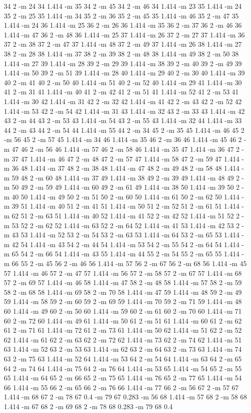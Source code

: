 \documentclass[12pt]{article}
\begin{document}
34 2 -m 24 34 1.414 -m 35 34 2 -m 45 34 2 -m 46 34 1.414 -m 23 35 1.414 -m 24 35 2 -m 25 35 1.414 -m 34 35 2 -m 36 35 2 -m 45 35 1.414 -m 46 35 2 -m 47 35 1.414 -m 24 36 1.414 -m 25 36 2 -m 26 36 1.414 -m 35 36 2 -m 37 36 2 -m 46 36 1.414 -m 47 36 2 -m 48 36 1.414 -m 25 37 1.414 -m 26 37 2 -m 27 37 1.414 -m 36 37 2 -m 38 37 2 -m 47 37 1.414 -m 48 37 2 -m 49 37 1.414 -m 26 38 1.414 -m 27 38 2 -m 28 38 1.414 -m 37 38 2 -m 39 38 2 -m 48 38 1.414 -m 49 38 2 -m 50 38 1.414 -m 27 39 1.414 -m 28 39 2 -m 29 39 1.414 -m 38 39 2 -m 40 39 2 -m 49 39 1.414 -m 50 39 2 -m 51 39 1.414 -m 28 40 1.414 -m 29 40 2 -m 30 40 1.414 -m 39 40 2 -m 41 40 2 -m 50 40 1.414 -m 51 40 2 -m 52 40 1.414 -m 29 41 1.414 -m 30 41 2 -m 31 41 1.414 -m 40 41 2 -m 42 41 2 -m 51 41 1.414 -m 52 41 2 -m 53 41 1.414 -m 30 42 1.414 -m 31 42 2 -m 32 42 1.414 -m 41 42 2 -m 43 42 2 -m 52 42 1.414 -m 53 42 2 -m 54 42 1.414 -m 31 43 1.414 -m 32 43 2 -m 33 43 1.414 -m 42 43 2 -m 44 43 2 -m 53 43 1.414 -m 54 43 2 -m 55 43 1.414 -m 32 44 1.414 -m 33 44 2 -m 43 44 2 -m 54 44 1.414 -m 55 44 2 -m 34 45 2 -m 35 45 1.414 -m 46 45 2 -m 56 45 2 -m 57 45 1.414 -m 34 46 1.414 -m 35 46 2 -m 36 46 1.414 -m 45 46 2 -m 47 46 2 -m 56 46 1.414 -m 57 46 2 -m 58 46 1.414 -m 35 47 1.414 -m 36 47 2 -m 37 47 1.414 -m 46 47 2 -m 48 47 2 -m 57 47 1.414 -m 58 47 2 -m 59 47 1.414 -m 36 48 1.414 -m 37 48 2 -m 38 48 1.414 -m 47 48 2 -m 49 48 2 -m 58 48 1.414 -m 59 48 2 -m 60 48 1.414 -m 37 49 1.414 -m 38 49 2 -m 39 49 1.414 -m 48 49 2 -m 50 49 2 -m 59 49 1.414 -m 60 49 2 -m 61 49 1.414 -m 38 50 1.414 -m 39 50 2 -m 40 50 1.414 -m 49 50 2 -m 51 50 2 -m 60 50 1.414 -m 61 50 2 -m 62 50 1.414 -m 39 51 1.414 -m 40 51 2 -m 41 51 1.414 -m 50 51 2 -m 52 51 2 -m 61 51 1.414 -m 62 51 2 -m 63 51 1.414 -m 40 52 1.414 -m 41 52 2 -m 42 52 1.414 -m 51 52 2 -m 53 52 2 -m 62 52 1.414 -m 63 52 2 -m 64 52 1.414 -m 41 53 1.414 -m 42 53 2 -m 43 53 1.414 -m 52 53 2 -m 54 53 2 -m 63 53 1.414 -m 64 53 2 -m 65 53 1.414 -m 42 54 1.414 -m 43 54 2 -m 44 54 1.414 -m 53 54 2 -m 55 54 2 -m 64 54 1.414 -m 65 54 2 -m 66 54 1.414 -m 43 55 1.414 -m 44 55 2 -m 54 55 2 -m 65 55 1.414 -m 66 55 2 -m 45 56 2 -m 46 56 1.414 -m 57 56 2 -m 67 56 2 -m 68 56 1.414 -m 45 57 1.414 -m 46 57 2 -m 47 57 1.414 -m 56 57 2 -m 58 57 2 -m 67 57 1.414 -m 68 57 2 -m 69 57 1.414 -m 46 58 1.414 -m 47 58 2 -m 48 58 1.414 -m 57 58 2 -m 59 58 2 -m 68 58 1.414 -m 69 58 2 -m 70 58 1.414 -m 47 59 1.414 -m 48 59 2 -m 49 59 1.414 -m 58 59 2 -m 60 59 2 -m 69 59 1.414 -m 70 59 2 -m 71 59 1.414 -m 48 60 1.414 -m 49 60 2 -m 50 60 1.414 -m 59 60 2 -m 61 60 2 -m 70 60 1.414 -m 71 60 2 -m 72 60 1.414 -m 49 61 1.414 -m 50 61 2 -m 51 61 1.414 -m 60 61 2 -m 62 61 2 -m 71 61 1.414 -m 72 61 2 -m 73 61 1.414 -m 50 62 1.414 -m 51 62 2 -m 52 62 1.414 -m 61 62 2 -m 63 62 2 -m 72 62 1.414 -m 73 62 2 -m 74 62 1.414 -m 51 63 1.414 -m 52 63 2 -m 53 63 1.414 -m 62 63 2 -m 64 63 2 -m 73 63 1.414 -m 74 63 2 -m 75 63 1.414 -m 52 64 1.414 -m 53 64 2 -m 54 64 1.414 -m 63 64 2 -m 65 64 2 -m 74 64 1.414 -m 75 64 2 -m 76 64 1.414 -m 53 65 1.414 -m 54 65 2 -m 55 65 1.414 -m 64 65 2 -m 66 65 2 -m 75 65 1.414 -m 76 65 2 -m 77 65 1.414 -m 54 66 1.414 -m 55 66 2 -m 65 66 2 -m 76 66 1.414 -m 77 66 2 -m 56 67 2 -m 57 67 1.414 -m 68 67 2 -m 78 67 0.4 -m 79 67 0.283 -m 56 68 1.414 -m 57 68 2 -m 58 68 1.414 -m 67 68 2 -m 69 68 2 -m 78 68 0.283 -m 79 68 0.4 
\end{document}
